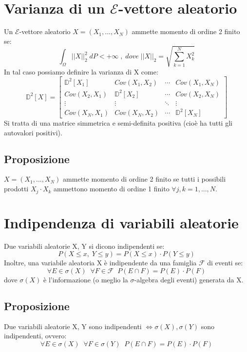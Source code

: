 \documentclass{article}
\begin{document}
\section*{Varianza di un $\mathcal{E}$-vettore aleatorio}
Un $\mathcal{E}$-vettore aleatorio $X = (X_{1},...,X_{N})$ ammette momento di ordine 2 finito se:
\[ \int_{\Omega}^{}||X||_{2}^{2} \; dP < +\infty \; , \; dove \; ||X||_{2} = \sqrt{\sum_{k=1}^{N}X_{k}^{2}} \]
In tal caso possiamo definire la varianza di X come:
\[ \mathbb{D}^{2}[X] = \left[\begin{matrix} \mathbb{D}^{2}[X_{1}] & Cov(X_{1},X_{2}) & \cdots & Cov(X_{1},X_{N}) \\ Cov(X_{2},X_{1}) & \mathbb{D}^{2}[X_{2}] & \cdots & Cov(X_{2},X_{N}) \\ \vdots & \vdots & \ddots & \vdots \\ Cov(X_{N},X_{1}) & Cov(X_{N},X_{2}) & \cdots & \mathbb{D}^{2}[X_{N}] \end{matrix}\right] \]
Si tratta di una matrice simmetrica e semi-definita positiva (cioè ha tutti gli autovalori positivi).

\subsection*{Proposizione}
$X = (X_{1},...,X_{N})$ ammette momento di ordine 2 finito se tutti i possibili prodotti $X_{j}\cdot X_{k}$ ammettono momento di ordine 1 finito $\forall j, k = 1,...,N$.

\section*{Indipendenza di variabili aleatorie}
Due variabili aleatorie X, Y si dicono indipendenti se:
\[ P(X \leq x, \; Y \leq y) = P(X \leq x)\cdot P(Y \leq y) \]
Inoltre, una variabile aleatoria X è indipendente da una famiglia $\mathcal{F}$ di eventi se:
\[ \forall E \in \sigma(X) \; \; \forall F \in \mathcal{F} \; \; P(E \cap F) = P(E)\cdot P(F) \]
dove $\sigma(X)$ è l'informazione (o meglio la $\sigma$-algebra degli eventi) generata da X.

\subsection*{Proposizione}
Due variabili aleatorie X, Y sono indipendenti $\iff \sigma(X), \sigma(Y)$ sono indipendenti, ovvero:
\[ \forall E \in \sigma(X) \; \; \forall F \in \sigma(Y) \; \; P(E \cap F) = P(E)\cdot P(F) \]
\end{document}
